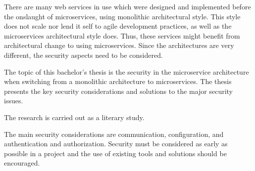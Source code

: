 \begin{enabstract}
    \begin{sloppypar}
        There are many web services in use which were designed and implemented 
        before the onslaught of microservices, using monolithic architectural style. 
        This style does not scale nor lend it self to agile development practices, 
        as well as the microservices architectural style does. Thus, these services might benefit 
        from architectural change to using microservices. Since the architectures
        are very different, the security aspects need to be considered.
    \end{sloppypar}
    \begin{sloppypar}
        The topic of this bachelor's thesis is the security in the microservice 
        architecture when switching from a monolithic architecture to 
        microservices. The thesis presents the key security 
        considerations and solutions to the major security issues.
    \end{sloppypar}
    \begin{sloppypar}
        The research is carried out as a literary study.
    \end{sloppypar}
    \begin{sloppypar}
        The main security considerations are communication, configuration, 
        and authentication and authorization. Security must be considered as early as possible in a project 
        and the use of existing tools and solutions should be encouraged.
    \end{sloppypar}
\end{enabstract}
